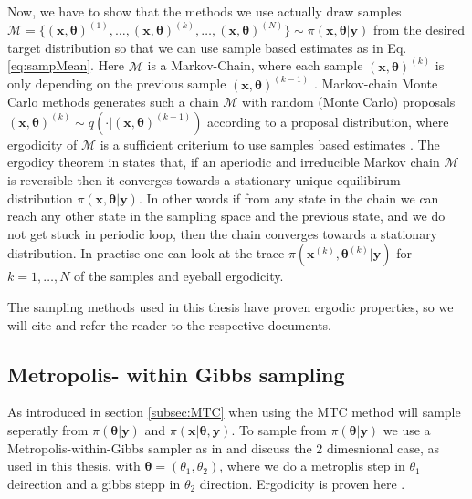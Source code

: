 Now, we have to show that the methods we use actually draw samples $ \mathcal{M} = \{ (\bm{x}, \bm{\theta} )^{(1)}, \dots, (\bm{x}, \bm{\theta} )^{(k)} , \dots,  (\bm{x}, \bm{\theta})^{(N)} \} \sim \pi(\bm{x},\bm{\theta}| \bm{y}) $ from the desired target distribution so that we can use sample based estimates as in Eq. \ref{eq:sampMean}.
Here $ \mathcal{M}$ is a Markov-Chain, where each sample $ (\bm{x}, \bm{\theta})^{(k)}$ is only depending on the previous sample  $ (\bm{x}, \bm{\theta})^{(k-1)}$ \cite{}.
Markov-chain Monte Carlo methods generates such a chain $\mathcal{M}$ with random (Monte Carlo) proposals $(\bm{x}, \bm{\theta})^{(k)} \sim q( \cdot |(\bm{x}, \bm{\theta})^{(k-1)})$ according to a proposal distribution, where ergodicity of $\mathcal{M}$ is a sufficient criterium to use samples based estimates \cite{tan2016LecNot, roberts2004general}.
The ergodicy theorem in \cite{tan2016LecNot} states that, if an aperiodic and irreducible Markov chain $\mathcal{M}$ is reversible then it converges towards a stationary unique equilibirum distribution $\pi(\bm{x},\bm{\theta}| \bm{y}) $.
In other words if from any state in the chain we can reach any other state in the sampling space and the previous state, and we do not get stuck in periodic loop, then the chain converges towards a stationary distribution.
In practise one can look at the trace $\pi(\bm{x}^{(k)},\bm{\theta}^{(k)}| \bm{y}) $ for $k = 1, \dots, N$ of the samples and eyeball ergodicity.

The sampling methods used in this thesis have proven ergodic properties, so we will cite and refer the reader to the respective documents.

\subsection{Metropolis- within Gibbs sampling}

As introduced in section \ref{subsec:MTC} when using the MTC method will sample seperatly from $\pi(\bm{\theta}| \bm{y})$ and $\pi(\bm{x}|\bm{\theta}, \bm{y}) $.
To sample from $\pi(\bm{\theta}| \bm{y})$ we use a Metropolis-within-Gibbs sampler as in \cite{fox2016fast} and discuss the 2 dimesnional case, as used in this thesis, with $\bm{\theta}  =( \theta_1 , \theta_2) $, where we do a metroplis step in $\theta_1$ deirection and a gibbs stepp in $\theta_2$ direction.
Ergodicity is proven here \cite{roberts2006harris}.

